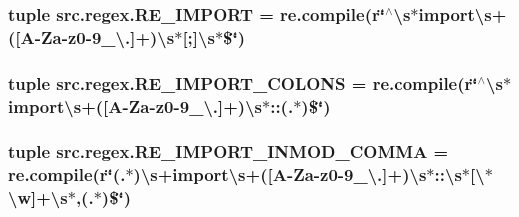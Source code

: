 \hypertarget{namespacesrc_1_1regex_a37e1bb1b20686d74fd1e8f3498c8a5cc}{
\subsubsection[{R\-E\-\_\-\-I\-M\-P\-O\-R\-T}]{\setlength{\rightskip}{0pt plus 5cm}tuple src.\-regex.\-R\-E\-\_\-\-I\-M\-P\-O\-R\-T = re.\-compile(r\char`\"{}$^\wedge$\textbackslash{}s$\ast$import\textbackslash{}s+(\mbox{[}A-\/Za-\/z0-\/9\-\_\-\textbackslash{}.\mbox{]}+)\textbackslash{}s$\ast$\mbox{[};\mbox{]}\textbackslash{}s$\ast$\$\char`\"{})}}\label{namespacesrc_1_1regex_a37e1bb1b20686d74fd1e8f3498c8a5cc}
\hypertarget{namespacesrc_1_1regex_a2c55bd8387e44744536b42a10eb31ac7}{
\subsubsection[{R\-E\-\_\-\-I\-M\-P\-O\-R\-T\-\_\-\-C\-O\-L\-O\-N\-S}]{\setlength{\rightskip}{0pt plus 5cm}tuple src.\-regex.\-R\-E\-\_\-\-I\-M\-P\-O\-R\-T\-\_\-\-C\-O\-L\-O\-N\-S = re.\-compile(r\char`\"{}$^\wedge$\textbackslash{}s$\ast$import\textbackslash{}s+(\mbox{[}A-\/Za-\/z0-\/9\-\_\-\textbackslash{}.\mbox{]}+)\textbackslash{}s$\ast$\-::(.$\ast$)\$\char`\"{})}}\label{namespacesrc_1_1regex_a2c55bd8387e44744536b42a10eb31ac7}
\hypertarget{namespacesrc_1_1regex_a2e33bcc0db973deb34c30cfdb17ed1e2}{
\subsubsection[{R\-E\-\_\-\-I\-M\-P\-O\-R\-T\-\_\-\-I\-N\-M\-O\-D\-\_\-\-C\-O\-M\-M\-A}]{\setlength{\rightskip}{0pt plus 5cm}tuple src.\-regex.\-R\-E\-\_\-\-I\-M\-P\-O\-R\-T\-\_\-\-I\-N\-M\-O\-D\-\_\-\-C\-O\-M\-M\-A = re.\-compile(r\char`\"{}(.$\ast$)\textbackslash{}s+import\textbackslash{}s+(\mbox{[}A-\/Za-\/z0-\/9\-\_\-\textbackslash{}.\mbox{]}+)\textbackslash{}s$\ast$\-::\textbackslash{}s$\ast$\mbox{[}\textbackslash{}$\ast$\textbackslash{}w\mbox{]}+\textbackslash{}s$\ast$,(.$\ast$)\$\char`\"{})}}\label{namespacesrc_1_1regex_a2e33bcc0db973deb34c30cfdb17ed1e2}
